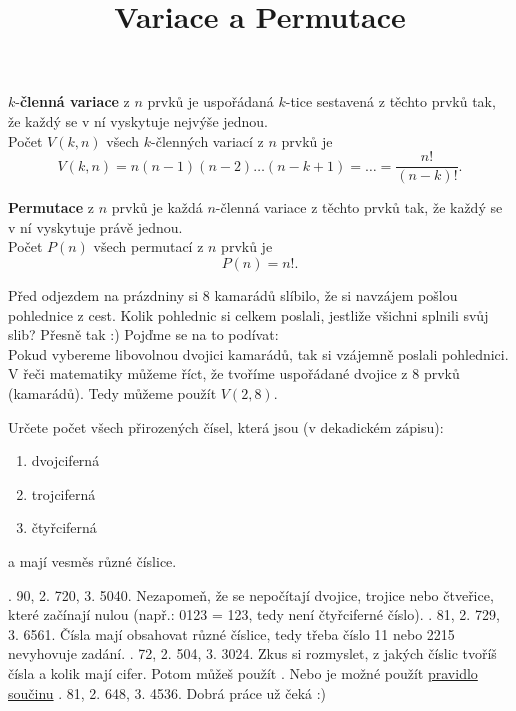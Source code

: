\documentclass[language = czech]{webquiz}
\title{Variace a Permutace}
\begin{document}
	\begin{discussion}[Variace][Variace]\label{d1} %
		$k$-\textbf{členná variace} z $n$ prvků je uspořádaná $k$-tice sestavená z těchto prvků tak, že každý se v ní vyskytuje nejvýše jednou.\\
		Počet $V(k,n)$ všech $k$-členných variací z $n$ prvků je \[V(k,n)=n(n-1)(n-2)\dots(n-k+1) = \dots = \frac{n!}{(n-k)!}.\]%
	\end{discussion}
	
	\begin{discussion}[Permutace][Permutace]\label{d2} %
		 \textbf{Permutace} z $n$ prvků je každá $n$-členná variace z těchto prvků tak, že každý se v ní vyskytuje právě jednou.\\
		 Počet $P(n)$ všech permutací z $n$ prvků je \[P(n)=n!.\]
	\end{discussion}
	
	\begin{question} \label{o1} %
		Před odjezdem na prázdniny si 8 kamarádů slíbilo, že si navzájem pošlou pohlednice z cest. Kolik pohlednic si celkem poslali, jestliže všichni splnili svůj slib? 	
		\whenRight Přesně tak :)  
		\whenWrong Pojďme se na to podívat:\\ Pokud vybereme libovolnou dvojici kamarádů, tak si vzájemně poslali pohlednici. V řeči matematiky můžeme říct, že tvoříme uspořádané dvojice z 8 prvků (kamarádů). Tedy můžeme použít  $V(2,8)$.
	\end{question}
	
	\begin{question} \label{o2} %
		Určete počet všech přirozených čísel, která jsou (v dekadickém zápisu):
		\begin{enumerate}
			\item dvojciferná
			\item trojciferná
			\item čtyřciferná
		\end{enumerate} a mají vesměs různé číslice. 
		\begin{choice}[columns=2]
			. 90, 2. 720, 3. 5040.
				\feedback Nezapomeň, že se nepočítají dvojice, trojice nebo čtveřice, které začínají nulou (např.: 0123 = 123, tedy není čtyřciferné číslo).
			. 81, 2. 729, 3. 6561.
				\feedback Čísla mají obsahovat různé číslice, tedy třeba číslo 11 nebo 2215 nevyhovuje zadání.
			. 72, 2. 504, 3. 3024. 
				\feedback Zkus si rozmyslet, z jakých číslic tvoříš čísla a kolik mají cifer. Potom můžeš použít . Nebo je možné použít \href{https://www.youtube.com/watch?v=JLheSkk4yWQ}{pravidlo součinu}
			. 81, 2. 648, 3. 4536.
				\feedback Dobrá práce  už čeká :)
		\end{choice}	
	\end{question}
		
\end{document}
